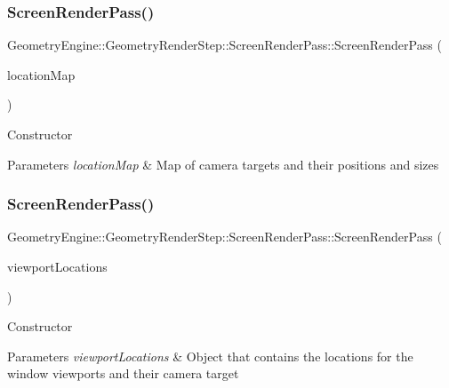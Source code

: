 \subsubsection{\texorpdfstring{ScreenRenderPass()}{ScreenRenderPass()}\hspace{0.1cm}{\footnotesize\ttfamily [2/4]}}
{\footnotesize\ttfamily Geometry\+Engine\+::\+Geometry\+Render\+Step\+::\+Screen\+Render\+Pass\+::\+Screen\+Render\+Pass (\begin{DoxyParamCaption}\item[{const std\+::map$<$ \mbox{\hyperlink{namespace_geometry_engine_1_1_geometry_world_item_1_1_geometry_camera_a3766848bae97ff8203fa26907ac359ef}{Geometry\+World\+Item\+::\+Geometry\+Camera\+::\+Camera\+Targets}}, Q\+Vector4D $>$ \&}]{location\+Map }\end{DoxyParamCaption})}

Constructor 
\begin{DoxyParams}{Parameters}
{\em location\+Map} & Map of camera targets and their positions and sizes \\
\hline
\end{DoxyParams}
\mbox{\label{class_geometry_engine_1_1_geometry_render_step_1_1_screen_render_pass_a40e341e548585d5068ca5eed0735f55a}} 
\subsubsection{\texorpdfstring{ScreenRenderPass()}{ScreenRenderPass()}\hspace{0.1cm}{\footnotesize\ttfamily [3/4]}}
{\footnotesize\ttfamily Geometry\+Engine\+::\+Geometry\+Render\+Step\+::\+Screen\+Render\+Pass\+::\+Screen\+Render\+Pass (\begin{DoxyParamCaption}\item[{const \mbox{\hyperlink{class_geometry_engine_1_1_geometry_render_step_1_1_screen_viewport_location}{Screen\+Viewport\+Location}} \&}]{viewport\+Locations }\end{DoxyParamCaption})}

Constructor 
\begin{DoxyParams}{Parameters}
{\em viewport\+Locations} & Object that contains the locations for the window viewports and their camera target \\
\hline
\end{DoxyParams}
\mbox{\label{class_geometry_engine_1_1_geometry_render_step_1_1_screen_render_pass_a9801a2d9e02c1b19816836c1348ddd4b}} 
